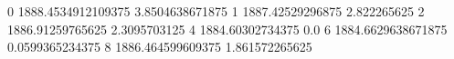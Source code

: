 0 1888.4534912109375 3.8504638671875
1 1887.42529296875 2.822265625
2 1886.91259765625 2.3095703125
4 1884.60302734375 0.0
6 1884.6629638671875 0.0599365234375
8 1886.464599609375 1.861572265625
